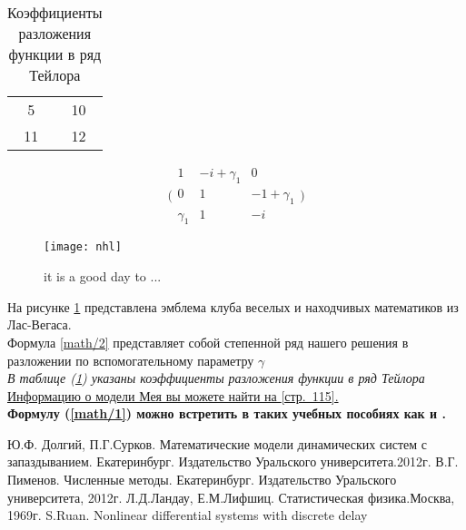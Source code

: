 \documentclass[12pt]{article}
\begin{document}
  \begin{table}
      \centering
      \begin{tabular}{ | c c |}
         \hline
           5 & 10 \\
          11 & 12 \\
          \hline
      \end{tabular}
      \caption{ Коэффициенты разложения функции в ряд Тейлора}
      \label{tab 1l}
  \end{table}
  \[ \Bigg(
  \begin{matrix}
        1 & -i+\gamma_1 & 0 \\
        0 & 1 & -1 + \gamma_1 \\
        \gamma_1 & 1 & -i
  \end{matrix}
   \Bigg)\]
\newpage
\begin{figure}
    \centering
    \texttt{[image: nhl]}
    \caption{it is a good day to ...}
    \label{picture1}
\end{figure}
На рисунке \ref{picture1} представлена эмблема клуба веселых и находчивых математиков из Лас-Вегаса.\\
\Large Формула \ref{math/2} представляет собой степенной ряд нашего решения в разложении по вспомогательному параметру $\gamma $ \\
\emph{ В таблице (\ref{tab 1l}) указаны коэффициенты разложения функции в ряд Тейлора}\\
\underline{Информацию о модели Мея вы можете найти на \cite{Dolgiy}[стр.~115].}\\
\textbf{ Формулу (\ref{math/1}) можно встретить в таких учебных пособиях как \cite{Pimenov} и \cite{landau}.}
\newpage
\begin{thebibliography}{5}
    Ю.Ф. Долгий, П.Г.Сурков. Математические модели динамических систем с запаздыванием. Екатеринбург. Издательство Уральского университета.2012г.
    В.Г. Пименов. Численные методы. Екатеринбург. Издательство Уральского университета, 2012г.
    Л.Д.Ландау, Е.М.Лифшиц. Статистическая физика.Москва, 1969г.
    S.Ruan. Nonlinear differential systems with discrete delay
    \end{thebibliography}
 
\end{document}
